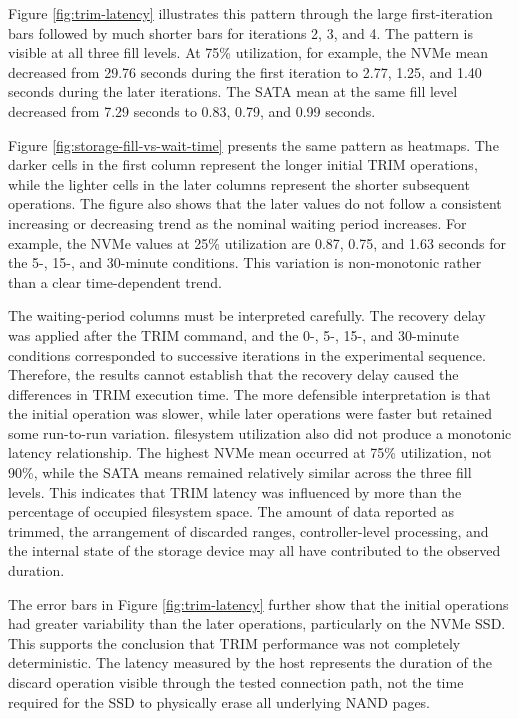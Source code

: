 Figure \ref{fig:trim-latency} illustrates this pattern through the large first-iteration bars followed by much shorter bars for iterations 2, 3, and 4. The pattern is 
visible at all three fill levels. At 75\% utilization, for example, the NVMe mean decreased from 29.76 seconds during the first iteration to 2.77, 1.25, and 1.40 seconds 
during the later iterations. The SATA mean at the same fill level decreased from 7.29 seconds to 0.83, 0.79, and 0.99 seconds.

Figure \ref{fig:storage-fill-vs-wait-time} presents the same pattern as heatmaps. The darker cells in the first column represent the longer initial TRIM operations, 
while the lighter cells in the later columns represent the shorter subsequent operations. The figure also shows that the later values do not follow a consistent 
increasing or decreasing trend as the nominal waiting period increases. For example, the NVMe values at 25\% utilization are 0.87, 0.75, and 1.63 seconds for the 5-, 
15-, and 30-minute conditions. This variation is non-monotonic rather than a clear time-dependent trend.

The waiting-period columns must be interpreted carefully. The recovery delay was applied after the TRIM command, and the 0-, 5-, 15-, and 30-minute conditions 
corresponded to successive iterations in the experimental sequence. Therefore, the results cannot establish that the recovery delay caused the differences in TRIM 
execution time. The more defensible interpretation is that the initial operation was slower, while later operations were faster but retained some run-to-run variation.
filesystem utilization also did not produce a monotonic latency relationship. The highest NVMe mean occurred at 75\% utilization, not 90\%, while the SATA means remained 
relatively similar across the three fill levels. This indicates that TRIM latency was influenced by more than the percentage of occupied filesystem space. The amount of 
data reported as trimmed, the arrangement of discarded ranges, controller-level processing, and the internal state of the storage device may all have contributed to the 
observed duration.

The error bars in Figure \ref{fig:trim-latency} further show that the initial operations had greater variability than the later operations, particularly on the NVMe SSD. 
This supports the conclusion that TRIM performance was not completely deterministic. The latency measured by the host represents the duration of the discard operation 
visible through the tested connection path, not the time required for the SSD to physically erase all underlying NAND pages.

